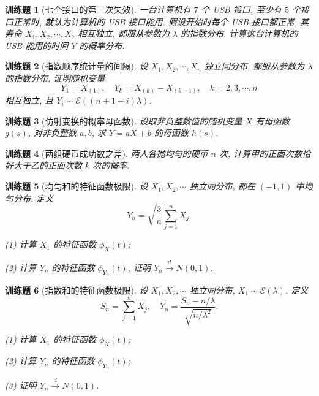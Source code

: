 \documentclass[UTF8,12pt,a4paper,fontset=fandol]{ctexbook}
\newtheorem{exercise}{训练题}[section]
\begin{document}
\begin{exercise}[七个接口的第三次失效]\label{q:A6.17}
一台计算机有 $7$ 个 USB 接口, 至少有 $5$ 个接口正常时, 就认为计算机的 USB 接口能用. 假设开始时每个 USB 接口都正常, 其寿命 $X_1,X_2,\cdots,X_7$ 相互独立, 都服从参数为 $\lambda$ 的指数分布. 计算这台计算机的 USB 能用的时间 $Y$ 的概率分布.\par{}\end{exercise}

\begin{exercise}[指数顺序统计量的间隔]\label{q:A6.20}
设 $X_1,X_2,\cdots,X_n$ 独立同分布, 都服从参数为 $\lambda$ 的指数分布, 证明随机变量
    \[Y_1=X_{(1)},\quad Y_k=X_{(k)}-X_{(k-1)},\quad k=2,3,\cdots,n\]
    相互独立, 且 $Y_i\sim\mathcal{E}((n+1-i)\lambda)$.\par{}\end{exercise}

\begin{exercise}[仿射变换的概率母函数]\label{q:A6.21}
设取非负整数值的随机变量 $X$ 有母函数 $g(s)$, 对非负整数 $a,b$, 求 $Y=aX+b$ 的母函数 $h(s)$.\par{}\end{exercise}

\begin{exercise}[两组硬币成功数之差]\label{q:A6.24}
两人各抛均匀的硬币 $n$ 次, 计算甲的正面次数恰好大于乙的正面次数 $k$ 次的概率.\par{}\end{exercise}

\begin{exercise}[均匀和的特征函数极限]\label{q:A6.29}
设 $X_1,X_2,\cdots$ 独立同分布, 都在 $(-1,1)$ 中均匀分布. 定义
    \[Y_n=\sqrt{\dfrac{3}{n}}\sum\limits_{j=1}^nX_j.\]

    (1) 计算 $X_1$ 的特征函数 $\phi_X(t)$;

    (2) 计算 $Y_n$ 的特征函数 $\phi_{Y_n}(t)$, 证明 $Y_n\xrightarrow{d}N(0,1)$.\par{}\end{exercise}

\begin{exercise}[指数和的特征函数极限]\label{q:A6.30}
设 $X_1,X_2,\cdots$ 独立同分布, $X_1\sim\mathcal{E}(\lambda)$. 定义
    \[S_n=\sum\limits_{j=1}^nX_j,\quad Y_n=\dfrac{S_n-n/\lambda}{\sqrt{n/\lambda^2}}.\]

    (1) 计算 $X_1$ 的特征函数 $\phi_X(t)$;

    (2) 计算 $Y_n$ 的特征函数 $\phi_{Y_n}(t)$;

    (3) 证明 $Y_n\xrightarrow{d}N(0,1)$.\par{}\end{exercise}
\end{document}
